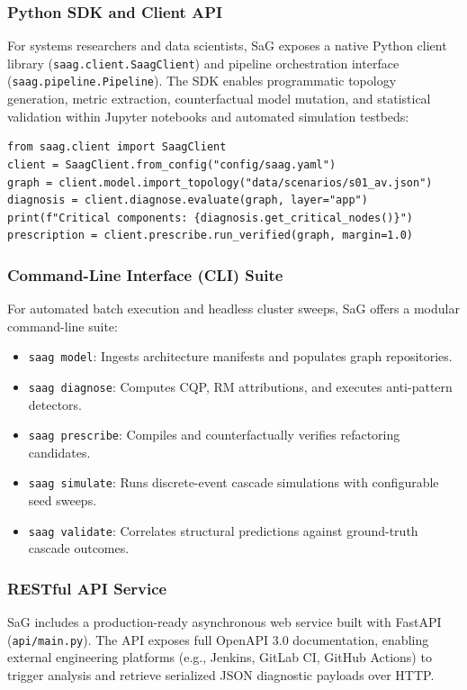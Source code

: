 \subsubsection{Python SDK and Client API}
For systems researchers and data scientists, SaG exposes a native Python client library (\texttt{saag.client.SaagClient}) and pipeline orchestration interface (\texttt{saag.pipeline.Pipeline}). The SDK enables programmatic topology generation, metric extraction, counterfactual model mutation, and statistical validation within Jupyter notebooks and automated simulation testbeds:
\begin{verbatim}
from saag.client import SaagClient
client = SaagClient.from_config("config/saag.yaml")
graph = client.model.import_topology("data/scenarios/s01_av.json")
diagnosis = client.diagnose.evaluate(graph, layer="app")
print(f"Critical components: {diagnosis.get_critical_nodes()}")
prescription = client.prescribe.run_verified(graph, margin=1.0)
\end{verbatim}

\subsubsection{Command-Line Interface (CLI) Suite}
For automated batch execution and headless cluster sweeps, SaG offers a modular command-line suite:
\begin{itemize}
    \item \texttt{saag model}: Ingests architecture manifests and populates graph repositories.
    \item \texttt{saag diagnose}: Computes CQP, RM attributions, and executes anti-pattern detectors.
    \item \texttt{saag prescribe}: Compiles and counterfactually verifies refactoring candidates.
    \item \texttt{saag simulate}: Runs discrete-event cascade simulations with configurable seed sweeps.
    \item \texttt{saag validate}: Correlates structural predictions against ground-truth cascade outcomes.
\end{itemize}

\subsubsection{RESTful API Service}
SaG includes a production-ready asynchronous web service built with FastAPI (\texttt{api/main.py}). The API exposes full OpenAPI 3.0 documentation, enabling external engineering platforms (e.g., Jenkins, GitLab CI, GitHub Actions) to trigger analysis and retrieve serialized JSON diagnostic payloads over HTTP.

